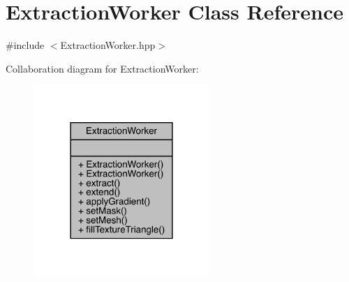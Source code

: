 \hypertarget{class_extraction_worker}{}\section{Extraction\+Worker Class Reference}
\label{class_extraction_worker}


{\ttfamily \#include $<$Extraction\+Worker.\+hpp$>$}



Collaboration diagram for Extraction\+Worker\+:\nopagebreak
\begin{figure}[H]
\begin{center}
\leavevmode
\includegraphics[width=189pt]{class_extraction_worker__coll__graph}
\end{center}
\end{figure}
